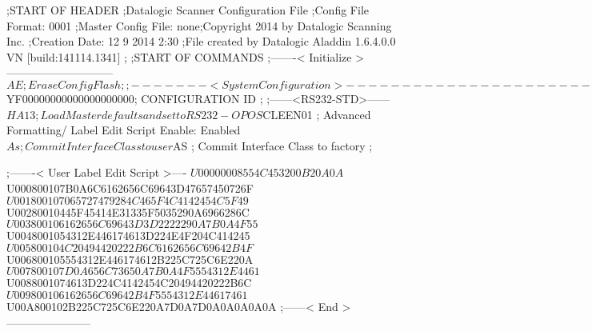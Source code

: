 ;START OF HEADER
;Datalogic Scanner Configuration File
;Config File Format: 0001
;Master Config File: none;Copyright 2014 by Datalogic Scanning Inc.
;Creation Date: 12 9 2014 2:30
;File created by Datalogic Aladdin 1.6.4.0.0 VN [build:141114.1341]
;
;START OF COMMANDS
;-------< Initialize >-----------------------------
$AE                 ; Erase Config Flash
;
;-------< System Configuration >-------------------------------
$YF00000000000000000000; CONFIGURATION ID
;
;------<RS232-STD>------
$HA13               ; Load Master defaults and set to RS232-OPOS
$CLEEN01            ; Advanced Formatting/ Label Edit Script Enable: Enabled
$As                 ; Commit Interface Class to user
$AS                 ; Commit Interface Class to factory
;

;-------< User Label Edit Script >----
$U00000008554C453200B20A0A
$U000800107B0A6C6162656C69643D47657450726F
$U001800107065727479284C465F4C4142454C5F49
$U00280010445F45414E31335F5035290A6966286C
$U003800106162656C69643D3D2222290A7B0A4F55
$U0048001054312E446174613D224E4F204C414245
$U005800104C20494420222B6C6162656C69642B4F
$U006800105554312E446174612B225C725C6E220A
$U007800107D0A656C73650A7B0A4F5554312E4461
$U0088001074613D224C4142454C20494420222B6C
$U009800106162656C69642B4F5554312E44617461
$U00A800102B225C725C6E220A7D0A7D0A0A0A0A0A
;------< End >-----------------------
